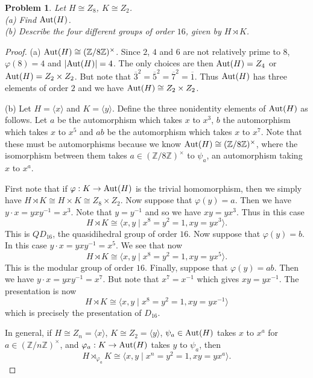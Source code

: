 \documentclass{article}
\newtheorem{problem}{Problem}
\newcommand{\aut}{\textup{Aut}}
\begin{document}

\begin{problem}
Let $H \cong Z_8$, $K \cong Z_2$.\\
(a) Find $\aut(H)$.\\
(b) Describe the four different groups of order $16$, given by $H \rtimes K$.
\end{problem}
\begin{proof}
(a) $\aut(H) \cong (\mathbb{Z}/8\mathbb{Z})^{\times}$. Since $2$, $4$ and $6$ are not relatively prime to $8$, $\varphi(8) = 4$ and $|\aut(H)| = 4$. The only choices are then $\aut(H) = Z_4$ or $\aut(H) = Z_2 \times Z_2$. But note that $\overline{3}^2 = \overline{5}^2 = \overline{7}^2 = \overline{1}$. Thus $\aut(H)$ has three elements of order $2$ and we have $\aut(H) \cong Z_2 \times Z_2$.

(b) Let $H = \langle x \rangle$ and $K = \langle y \rangle$. Define the three nonidentity elements of $\aut(H)$ as follows. Let $a$ be the automorphism which takes $x$ to $x^3$, $b$ the automorphism which takes $x$ to $x^5$ and $ab$ be the automorphism which takes $x$ to $x^7$. Note that these must be automorphisms because we know $\aut(H) \cong (\mathbb{Z}/8\mathbb{Z})^{\times}$, where the isomorphism between them takes $a \in (\mathbb{Z}/8\mathbb{Z})^{\times}$ to $\psi_a$, an automorphism taking $x$ to $x^a$.

First note that if $\varphi : K \to \aut(H)$ is the trivial homomorphism, then we simply have $H \rtimes K \cong H \times K \cong Z_8 \times Z_2$. Now suppose that $\varphi(y) = a$. Then we have $y \cdot x = yxy^{-1} = x^3$. Note that $y = y^{-1}$ and so we have $xy = yx^3$. Thus in this case
\[
H \rtimes K \cong \langle x, y \mid x^8 = y^2 = 1, xy = yx^3 \rangle.
\]
This is $QD_{16}$, the quasidihedral group of order $16$. Now suppose that $\varphi(y) = b$. In this case $y \cdot x = yxy^{-1} = x^5$. We see that now
\[
H \rtimes K \cong \langle x, y \mid x^8 = y^2 = 1, xy = yx^5 \rangle.
\]
This is the modular group of order $16$. Finally, suppose that $\varphi(y) = ab$. Then we have $y \cdot x = yxy^{-1} = x^7$. But note that $x^7 = x^{-1}$ which gives $xy = yx^{-1}$. The presentation is now
\[
H \rtimes K \cong \langle x, y \mid x^8 = y^2 = 1, xy = yx^{-1} \rangle
\]
which is precisely the presentation of $D_{16}$.

In general, if $H \cong Z_n = \langle x \rangle$, $K \cong Z_2 = \langle y \rangle$, $\psi_a \in \aut(H)$ takes $x$ to $x^a$ for $a \in (\mathbb{Z}/n\mathbb{Z})^{\times}$, and $\varphi_a : K \to \aut(H)$ takes $y$ to $\psi_a$, then
\[
H \rtimes_{\varphi_a} K \cong \langle x, y \mid x^n = y^2 = 1, xy = yx^a \rangle.
\]
\end{proof}
\end{document}
